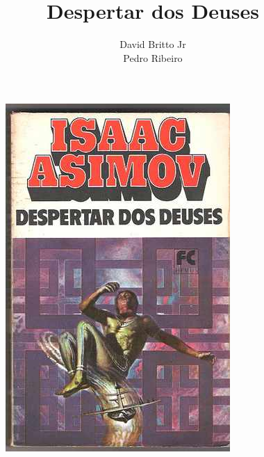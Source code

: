 \documentclass[14pt,portuguese]{extreport}
\title{Despertar dos Deuses} %
\author {David Britto Jr \\ Pedro Ribeiro} %
\begin{document}
  
  \maketitle %
  
  \tableofcontents
  
  \newpage
  \begin{figure}[h]
    \centering
    \includegraphics[width=\textwidth]{despertar_deuses_capa}
  \end{figure}
  
\end{document}
